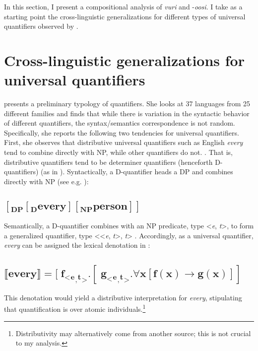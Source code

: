 \documentclass[output=paper]{langsci/langscibook}
\begin{document}
In this section, I present a compositional analysis of \textit{vuri} and -\textit{oosi}. I take as a starting point the cross-linguistic generalizations for different types of universal quantifiers observed by \citet{Matthewson2013}. 

\section{Cross-linguistic generalizations for universal quantifiers}

\citet{Matthewson2013} presents a preliminary typology of quantifiers. She looks at 37 languages from 25 different families and finds that while there is variation in the syntactic behavior of different quantifiers, the syntax/semantics correspondence is not random. Specifically, she reports the following two tendencies for universal quantifiers. First, she observes that distributive universal quantifiers such as English \textit{every} tend to {\textquotedbl}combine directly with NP, while other quantifiers do not.{\textquotedbl} \citep[36]{Matthewson2013}. That is, distributive quantifiers tend to be determiner quantifiers (henceforth D-quantifiers) (as in \citealt{BarwiseCooper1981}). Syntactically, a D-quantifier heads a DP and combines directly with NP (see e.g. \citealt[146]{HeimKratzer1998}): 

\subsection{$\mathbf{[_{DP} [_{D} every] [_{NP} person]]}$}

Semantically, a D-quantifier combines with an NP predicate, type <\textit{e}, \textit{t}>, to form a generalized quantifier, type <<\textit{e}, \textit{t}>, \textit{t}> \citep{Montague1973,BarwiseCooper1981}. Accordingly, as a universal quantifier, \textit{every} can be assigned the lexical denotation in :

\subsection{$\mathbf{⟦{every}⟧ = [{f}_{<}{_{e}}_{,}{_{ t}}_{>} . [{g}_{<}{_{e}}_{,}{_{ t}}_{>} . {\forall}{x} [ {f(x)} \to {g}({x})]]}$}

This denotation would yield a distributive interpretation for \textit{every}, stipulating that quantification is over atomic individuals.\footnote{ Distributivity may alternatively come from another source; this is not crucial to my analysis.}
\end{document}
